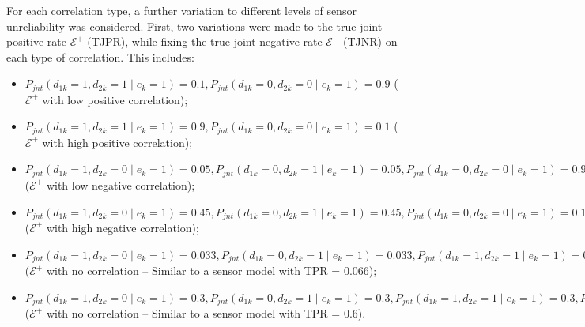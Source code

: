 For each correlation type, a further variation to different levels of sensor unreliability was considered. First, two variations were made to the true joint positive rate $\mathcal{E^+}$ (TJPR), while fixing the true joint negative rate $\mathcal{E^-}$ (TJNR) on each type of correlation. This includes:
\begin{itemize}
    \item $P_{jnt}(d_{1k}=1, d_{2k}=1 \mid e_k=1) = 0.1, P_{jnt}(d_{1k}=0, d_{2k}=0 \mid e_k=1) = 0.9$ ($\mathcal{E^+}$ with low positive correlation);
    \item $P_{jnt}(d_{1k}=1, d_{2k}=1 \mid e_k=1) = 0.9, P_{jnt}(d_{1k}=0, d_{2k}=0 \mid e_k=1) = 0.1$ ($\mathcal{E^+}$ with high positive correlation);
    \item $P_{jnt}(d_{1k}=1, d_{2k}=0 \mid e_k=1) = 0.05, P_{jnt}(d_{1k}=0, d_{2k}=1 \mid e_k=1) = 0.05, P_{jnt}(d_{1k}=0, d_{2k}=0 \mid e_k=1) = 0.9$ ($\mathcal{E^+}$ with low negative correlation);
    \item $P_{jnt}(d_{1k}=1, d_{2k}=0 \mid e_k=1) = 0.45, P_{jnt}(d_{1k}=0, d_{2k}=1 \mid e_k=1) = 0.45, P_{jnt}(d_{1k}=0, d_{2k}=0 \mid e_k=1) = 0.1$ ($\mathcal{E^+}$ with high negative correlation);
    \item $P_{jnt}(d_{1k}=1, d_{2k}=0 \mid e_k=1) = 0.033, P_{jnt}(d_{1k}=0, d_{2k}=1 \mid e_k=1) = 0.033, P_{jnt}(d_{1k}=1, d_{2k}=1 \mid e_k=1) = 0.033, P_{jnt}(d_{1k}=0, d_{2k}=0 \mid e_k=1) = 0.901$ ($\mathcal{E^+}$ with no correlation -- Similar to a sensor model with TPR = 0.066);
    \item $P_{jnt}(d_{1k}=1, d_{2k}=0 \mid e_k=1) = 0.3, P_{jnt}(d_{1k}=0, d_{2k}=1 \mid e_k=1) = 0.3, P_{jnt}(d_{1k}=1, d_{2k}=1 \mid e_k=1) = 0.3, P_{jnt}(d_{1k}=0, d_{2k}=0 \mid e_k=1) = 0.1$ ($\mathcal{E^+}$ with no correlation -- Similar to a sensor model with TPR = 0.6).
\end{itemize}

